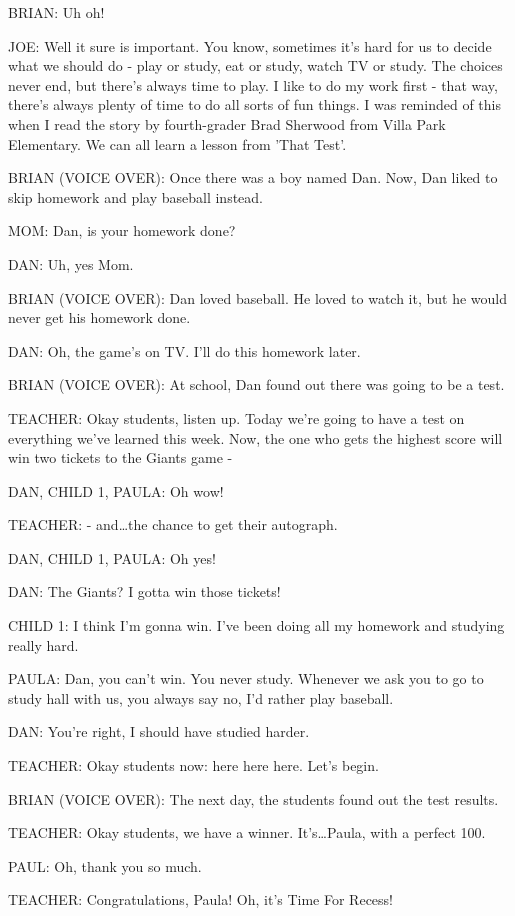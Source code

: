 BRIAN:
Uh oh!

JOE:
Well it sure is important.
You know, sometimes it's hard for us to decide what we should do - play or study, eat or study, watch TV or study.
The choices never end, but there's always time to play.
I like to do my work first - that way, there's always plenty of time to do all sorts of fun things.
I was reminded of this when I read the story by fourth-grader Brad Sherwood from Villa Park Elementary.
We can all learn a lesson from 'That Test'.

BRIAN (VOICE OVER):
Once there was a boy named Dan.
Now, Dan liked to skip homework and play baseball instead.

MOM:
Dan, is your homework done?

DAN:
Uh, yes Mom.

BRIAN (VOICE OVER):
Dan loved baseball.
He loved to watch it, but he would never get his homework done.

DAN:
Oh, the game's on TV.
I'll do this homework later.

BRIAN (VOICE OVER):
At school, Dan found out there was going to be a test.

TEACHER:
Okay students, listen up.
Today we're going to have a test on everything we've learned this week.
Now, the one who gets the highest score will win two tickets to the Giants game -

DAN, CHILD 1, PAULA:
Oh wow!

TEACHER:
- and\dots the chance to get their autograph.

DAN, CHILD 1, PAULA:
Oh yes!

DAN:
The Giants?
I gotta win those tickets!

CHILD 1:
I think I'm gonna win.
I've been doing all my homework and studying really hard.

PAULA:
Dan, you can't win.
You never study.
Whenever we ask you to go to study hall with us, you always say no, I'd rather play baseball.

DAN:
You're right, I should have studied harder.

TEACHER:
Okay students now: here here here.
Let's begin.

BRIAN (VOICE OVER):
The next day, the students found out the test results.

TEACHER:
Okay students, we have a winner.
It's\dots Paula, with a perfect 100.

PAUL:
Oh, thank you so much.

TEACHER:
Congratulations, Paula!
Oh, it's Time For Recess!

